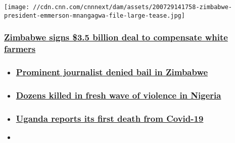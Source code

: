 \href{/2020/07/29/africa/zimbabwe-compensation-white-farmers/index.html}{}

\texttt{[image: //cdn.cnn.com/cnnnext/dam/assets/200729141758-zimbabwe-president-emmerson-mnangagwa-file-large-tease.jpg]}

\hypertarget{zimbabwe-signs-35-billion-deal-to-compensate-white-farmers}{%
\subsubsection{\texorpdfstring{\href{/2020/07/29/africa/zimbabwe-compensation-white-farmers/index.html}{Zimbabwe
signs \$3.5 billion deal to compensate white
farmers}}{Zimbabwe signs \$3.5 billion deal to compensate white farmers}}\label{zimbabwe-signs-35-billion-deal-to-compensate-white-farmers}}

\begin{itemize}
\item
  \hypertarget{prominent-journalist-denied-bail-in-zimbabwe}{%
  \subsubsection{\texorpdfstring{\href{/2020/07/24/africa/zimbabwe-journalist-chinono-denied-bail/index.html}{Prominent
  journalist denied bail in
  Zimbabwe}}{Prominent journalist denied bail in Zimbabwe}}\label{prominent-journalist-denied-bail-in-zimbabwe}}
\item
  \hypertarget{dozens-killed-in-fresh-wave-of-violence-in-nigeria-}{%
  \subsubsection{\texorpdfstring{\href{/2020/07/25/africa/nigeria-kaduna-violence-intl/index.html}{Dozens
  killed in fresh wave of violence in Nigeria
  }}{Dozens killed in fresh wave of violence in Nigeria }}\label{dozens-killed-in-fresh-wave-of-violence-in-nigeria-}}
\item
  \hypertarget{uganda-reports-its-first-death-from-covid-19-}{%
  \subsubsection{\texorpdfstring{\href{/2020/07/24/africa/uganda-first-covid-19-death/index.html}{Uganda
  reports its first death from Covid-19
  }}{Uganda reports its first death from Covid-19 }}\label{uganda-reports-its-first-death-from-covid-19-}}
\item
  \hypertarget{tensions-over-nile-river-dam-project-as-heavy-rain-sows-confusion}{%
}
\end{itemize}
